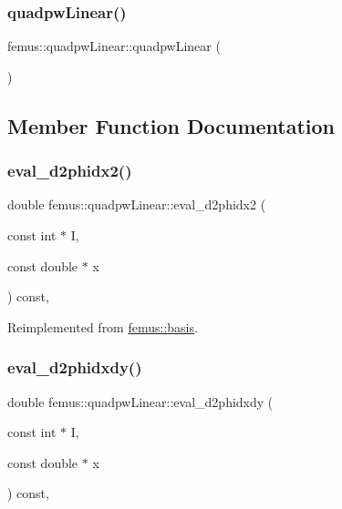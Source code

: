\subsubsection{\texorpdfstring{quadpw\+Linear()}{quadpwLinear()}}
{\footnotesize\ttfamily femus\+::quadpw\+Linear\+::quadpw\+Linear (\begin{DoxyParamCaption}{ }\end{DoxyParamCaption})\hspace{0.3cm}{\ttfamily [inline]}}



\subsection{Member Function Documentation}
\mbox{\label{classfemus_1_1quadpw_linear_a1e4149a8bc6f1a9c6cd12640b15e6deb}} 
\subsubsection{\texorpdfstring{eval\+\_\+d2phidx2()}{eval\_d2phidx2()}}
{\footnotesize\ttfamily double femus\+::quadpw\+Linear\+::eval\+\_\+d2phidx2 (\begin{DoxyParamCaption}\item[{const int $\ast$}]{I,  }\item[{const double $\ast$}]{x }\end{DoxyParamCaption}) const\hspace{0.3cm}{\ttfamily [inline]}, {\ttfamily [virtual]}}



Reimplemented from \mbox{\hyperlink{classfemus_1_1basis_a0a9839e75d1c9c8302486fc072eed028}{femus\+::basis}}.

\mbox{\label{classfemus_1_1quadpw_linear_a5e98b28c5ca4e382d3bf0ac7f1f3aa0c}} 
\subsubsection{\texorpdfstring{eval\+\_\+d2phidxdy()}{eval\_d2phidxdy()}}
{\footnotesize\ttfamily double femus\+::quadpw\+Linear\+::eval\+\_\+d2phidxdy (\begin{DoxyParamCaption}\item[{const int $\ast$}]{I,  }\item[{const double $\ast$}]{x }\end{DoxyParamCaption}) const\hspace{0.3cm}{\ttfamily [inline]}, {\ttfamily [virtual]}}




